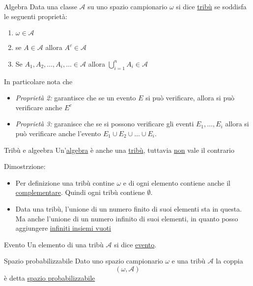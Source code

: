 \begin{definizione}{Algebra}
	Data una classe $ \mathcal{A} $ su uno spazio campionario $ \omega  $ si dice \underline{tribù} se soddisfa le seguenti proprietà:
	\begin{enumerate}
		\item $ \omega \in \mathcal{A}$
		\item se $ A \in  \mathcal{A} $ allora $ A^{c} \in  \mathcal{A} $
		\item Se $ A_1, A_2,\ldots,A_i, \ldots \in \mathcal{A} $ allora $ \bigcup_{i=1}^n A_i \in \mathcal{A} $
	\end{enumerate}
\end{definizione}
In particolare nota che
\begin{itemize}
	\item \textit{Proprietà 2:} garantisce che se un evento $ E $ si può verificare, allora si può verificare anche $ E^{c} $
	\item  \textit{Proprietà 3:} garanisce che se si possono verificare gli eventi $ E_1,\ldots,E_i $ allora si può verificare anche l'evento $ E_1 \cup  E_2 \cup \ldots \cup  E_i $.
\end{itemize}
\begin{teorema}{Tribù e algeebra}
	Un'\underline{algebra} è anche una \underline{tribù}, tuttavia \underline{non} vale il contrario
\end{teorema}
Dimostrzione:
\begin{itemize}
	\item Per definizione una tribù contine $ \omega  $ e di ogni elemento contiene anche il \underline{complementare}. Quindi ogni tribù contiene $ \emptyset  $.
	\item Data una tribù, l'unione di un numero finito di suoi elementi sta in questa. Ma anche l'unione di un numero infinito di suoi elementi, in quanto posso aggiungere \underline{infiniti insiemi vuoti}
\end{itemize}

\begin{definizione}{Evento}
	Un elemento di una tribù $ \mathcal{A} $ si dice \underline{evento}.
\end{definizione}
\begin{definizione}{Spazio probabilizzabile}
	Dato uno spazio campionario $ \omega  $ e una tribù $ \mathcal{A} $ la coppia
	\[
		\left(\omega , \mathcal{A}\right)
	\]
	è detta \underline{spazio probabilizzabile}
\end{definizione}

